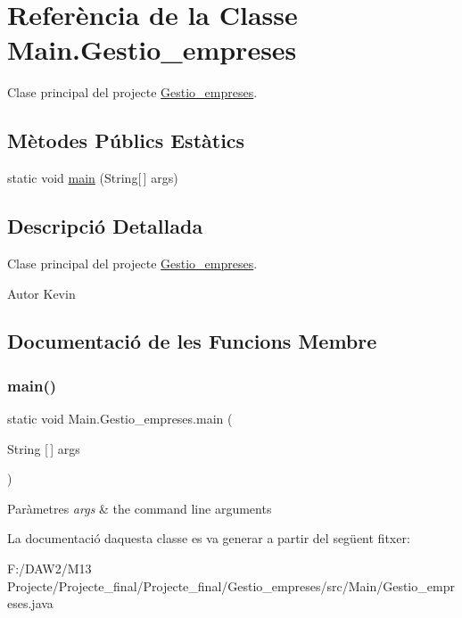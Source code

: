 \hypertarget{class_main_1_1_gestio__empreses}{}\section{Referència de la Classe Main.\+Gestio\+\_\+empreses}
\label{class_main_1_1_gestio__empreses}


Clase principal del projecte \mbox{\hyperlink{class_main_1_1_gestio__empreses}{Gestio\+\_\+empreses}}.  


\subsection*{Mètodes Públics Estàtics}
\begin{DoxyCompactItemize}
\item 
static void \mbox{\hyperlink{class_main_1_1_gestio__empreses_a42da147e659ca5acb8218e0eb2517589}{main}} (String\mbox{[}$\,$\mbox{]} args)
\end{DoxyCompactItemize}


\subsection{Descripció Detallada}
Clase principal del projecte \mbox{\hyperlink{class_main_1_1_gestio__empreses}{Gestio\+\_\+empreses}}. 

\begin{DoxyAuthor}{Autor}
Kevin 
\end{DoxyAuthor}


\subsection{Documentació de les Funcions Membre}
\mbox{\label{class_main_1_1_gestio__empreses_a42da147e659ca5acb8218e0eb2517589}} 
\subsubsection{\texorpdfstring{main()}{main()}}
{\footnotesize\ttfamily static void Main.\+Gestio\+\_\+empreses.\+main (\begin{DoxyParamCaption}\item[{String \mbox{[}$\,$\mbox{]}}]{args }\end{DoxyParamCaption})\hspace{0.3cm}{\ttfamily [static]}}


\begin{DoxyParams}{Paràmetres}
{\em args} & the command line arguments \\
\hline
\end{DoxyParams}


La documentació d\textquotesingle{}aquesta classe es va generar a partir del següent fitxer\+:\begin{DoxyCompactItemize}
\item 
F\+:/\+D\+A\+W2/\+M13 Projecte/\+Projecte\+\_\+final/\+Projecte\+\_\+final/\+Gestio\+\_\+empreses/src/\+Main/Gestio\+\_\+empreses.\+java\end{DoxyCompactItemize}
